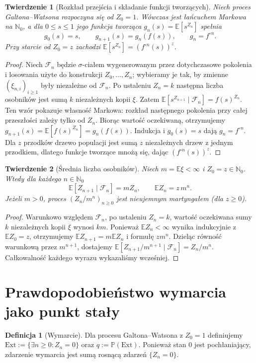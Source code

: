 \documentclass[11pt,a4paper,oneside]{report}
\numberwithin{equation}{chapter}
\theoremstyle{plain}
\newtheorem{twierdzenie}{Twierdzenie}[chapter]
\theoremstyle{definition}
\newtheorem{definicja}{Definicja}[chapter]
\theoremstyle{remark}
\newcommand{\N}{\mathbb{N}}
\newcommand{\Prob}{\mathbb{P}}
\newcommand{\E}{\mathbb{E}}
\newcommand{\calF}{\mathcal{F}}
\begin{document}
\begin{twierdzenie}[Rozkład przejścia i składanie funkcji tworzących]
Niech proces Galtona--Watsona rozpoczyna się od $Z_0=1$.
Wówczas jest łańcuchem Markowa na $\N_0$, a dla
$0\le s\le1$ jego funkcja tworząca $g_n(s)=\E[s^{Z_n}]$
spełnia
\[
g_0(s)=s,\qquad g_{n+1}(s)=g_n(f(s)),
\qquad g_n=f^{\circ n}.
\]
Przy starcie od $Z_0=z$ zachodzi $\E[s^{Z_n}]=(f^{\circ n}(s))^z$.
\end{twierdzenie}
\begin{proof}
Niech $\calF_n$ będzie $\sigma$-ciałem wygenerowanym
przez dotychczasowe pokolenia i losowania użyte do konstrukcji
$Z_0,\ldots,Z_n$; wybieramy je tak, by zmienne
$(\xi_{n,i})_{i\ge1}$ były niezależne od $\calF_n$.
Po ustaleniu $Z_n=k$ następna liczba osobników jest sumą
$k$ niezależnych kopii $\xi$. Zatem
$\E[s^{Z_{n+1}}\mid\calF_n]=f(s)^{Z_n}$.
Ten wzór pokazuje własność Markowa: rozkład następnego pokolenia
przy całej przeszłości zależy tylko od $Z_n$.
Biorąc wartość oczekiwaną, otrzymujemy
$g_{n+1}(s)=\E[f(s)^{Z_n}]=g_n(f(s))$.
Indukcja i $g_0(s)=s$ dają $g_n=f^{\circ n}$.
Dla $z$ przodków drzewo populacji jest sumą $z$
niezależnych drzew z jednym przodkiem, dlatego
funkcje tworzące mnożą się, dając $(f^{\circ n}(s))^z$.
\end{proof}

\begin{twierdzenie}[Średnia liczba osobników]
Niech $m=\E\xi<\infty$ i $Z_0=z\in\N_0$.
Wtedy dla każdego $n\in\N_0$
\[
\E[Z_{n+1}\mid\calF_n]=mZ_n,\qquad
\E Z_n=z\,m^n.
\]
Jeżeli $m>0$, proces $(Z_n/m^n)_{n\ge0}$ jest
nieujemnym martyngałem (dla $z\ge0$).
\end{twierdzenie}
\begin{proof}
Warunkowo względem $\calF_n$, po ustaleniu $Z_n=k$,
wartość oczekiwana sumy $k$ niezależnych kopii $\xi$
wynosi $km$. Ponieważ $\E Z_n<\infty$ wynika
indukcyjnie z $\E Z_0=z$, otrzymujemy
$\E Z_{n+1}=m\E Z_n$ i formułę $zm^n$.
Dzieląc równość warunkową przez $m^{n+1}$,
dostajemy $\E[Z_{n+1}/m^{n+1}\mid\calF_n]=Z_n/m^n$.
Całkowalność każdego wyrazu wykazaliśmy wcześniej.
\end{proof}

\section{Prawdopodobieństwo wymarcia jako punkt stały}
\begin{definicja}[Wymarcie]
Dla procesu Galtona--Watsona z $Z_0=1$ definiujemy
$\mathrm{Ext}:=\{\exists n\ge0:Z_n=0\}$ oraz
$q:=\Prob(\mathrm{Ext})$.
Ponieważ stan $0$ jest pochłaniający,
zdarzenie wymarcia jest sumą rosnącą zdarzeń $\{Z_n=0\}$.
\end{definicja}
\end{document}
